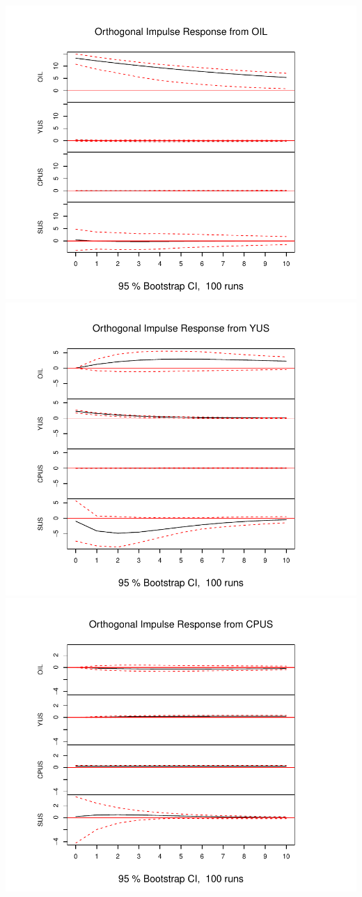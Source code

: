 \documentclass[11pt,preprint, authoryear]{elsarticle}
\numberwithin{equation}{section}
\numberwithin{figure}{section}
\numberwithin{table}{section}
\begin{document}
\includegraphics{replication_files/figure-latex/unnamed-chunk-6-1.pdf}
\includegraphics{replication_files/figure-latex/unnamed-chunk-6-2.pdf}
\includegraphics{replication_files/figure-latex/unnamed-chunk-6-3.pdf}
\end{document}
